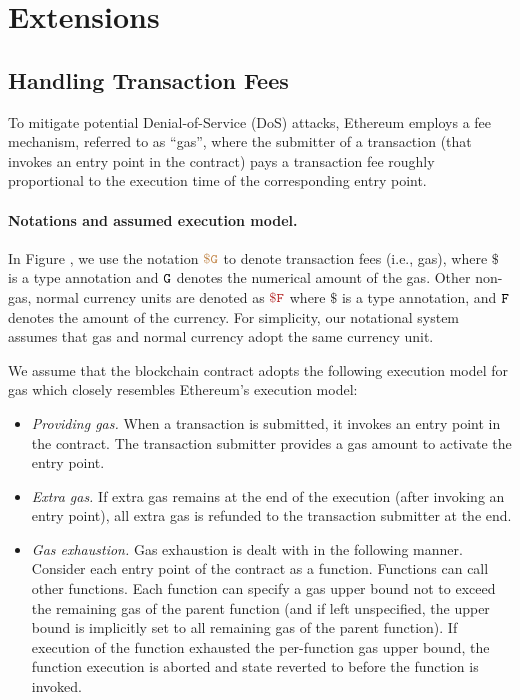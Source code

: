 \section{Extensions}



\subsection{Handling Transaction Fees}

To mitigate potential Denial-of-Service (DoS) attacks, 
Ethereum employs a fee mechanism, referred to as ``gas'', 
where the submitter of a transaction (that invokes
an entry point in the contract) pays a  
transaction fee
roughly proportional to the execution time of the 
corresponding entry point.

\paragraph{Notations and assumed execution model.}
In Figure , we
use the notation $\tt {\color{brown} \$ G }$
to denote transaction fees (i.e., gas), 
where $\$$ is a type annotation 
and ${\tt G}$ denotes the numerical amount of the  
gas. Other non-gas, normal currency units 
are denoted as $\smaroon{\$ F}$ where $\$$ is a type annotation,
and ${\tt F}$ denotes the amount of the currency. 
For simplicity, our notational system assumes 
that gas and normal currency adopt
the same currency unit. 

We assume that the blockchain contract adopts the following execution model
for gas which closely resembles Ethereum's execution model:
\begin{itemize}[leftmargin=5mm]
\item
{\it Providing gas.} 
When a transaction is submitted, it invokes an entry point in the contract.
The transaction submitter provides a gas amount to activate the entry point. 
\item
{\it Extra gas.} 
If extra gas remains at the end of the execution (after invoking an entry point),
all extra gas is refunded to the transaction submitter at the end.
\item
{\it Gas exhaustion.} 
Gas exhaustion is dealt with in the following manner.
Consider each entry point of the contract as a function. 
Functions can call other functions.
Each function can specify a gas upper bound not to exceed
the remaining gas of the parent function (and if left unspecified,
the upper bound is implicitly set to all remaining gas of the parent function).
If execution of the function exhausted the per-function gas 
upper bound, the function execution is aborted and 
state reverted to before the function is invoked.
\end{itemize}

